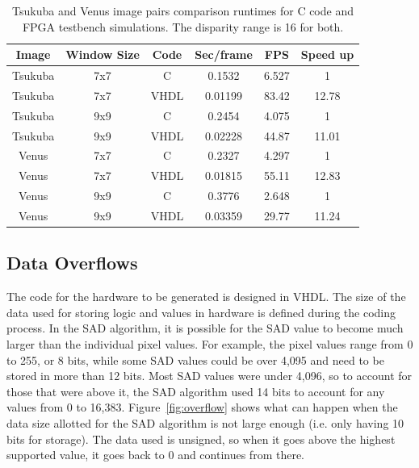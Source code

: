 \begin{table}
	\begin{center}
		\begin{tabu}{|c|c|c|c|c|c|}
			\hline
				\rowstyle{\bfseries} Image & 
				\rowstyle{\bfseries} Window Size & 
				\rowstyle{\bfseries} Code & 
				\rowstyle{\bfseries} Sec/frame & 
				\rowstyle{\bfseries} FPS &
				\rowstyle{\bfseries} Speed up
			\\ \hline 
			Tsukuba & 7x7 & C & 0.1532 & 6.527 & 1
			\\ \hline 
			Tsukuba & 7x7 & VHDL & 0.01199 & 83.42 & 12.78
			\\ \tabucline[2pt]{-}
			Tsukuba & 9x9 & C & 0.2454 & 4.075 & 1
			\\ \hline 
			Tsukuba & 9x9 & VHDL & 0.02228 & 44.87 & 11.01
			\\ \tabucline[2pt]{-}
			Venus & 7x7 & C & 0.2327 & 4.297 & 1
			\\ \hline 
			Venus & 7x7 & VHDL & 0.01815 & 55.11 & 12.83
			\\ \tabucline[2pt]{-}
			Venus & 9x9 & C & 0.3776 & 2.648 & 1
			\\ \hline 
			Venus & 9x9 & VHDL & 0.03359 & 29.77 & 11.24
			\\ \hline 
		\end{tabu}	
		\captionfonts
		\caption{Tsukuba and Venus image pairs comparison runtimes for C code and FPGA testbench simulations. The disparity range is 16 for both.}
		\label{table:runtimeComp}
	\end{center}
\end{table}

\subsection{Data Overflows}
\label{sec:overflow}

The code for the hardware to be generated is designed in VHDL. The size of the data used for storing logic and values in hardware is defined during the coding process. In the SAD algorithm, it is possible for the SAD value to become much larger than the individual pixel values. For example, the pixel values range from 0 to 255, or 8 bits, while some SAD values could be over 4,095 and need to be stored in more than 12 bits. Most SAD values were under 4,096, so to account for those that were above it, the SAD algorithm used 14 bits to account for any values from 0 to 16,383. Figure~\ref{fig:overflow} shows what can happen when the data size allotted for the SAD algorithm is not large enough (i.e. only having 10 bits for storage). The data used is unsigned, so when it goes above the highest supported value, it goes back to 0 and continues from there.

